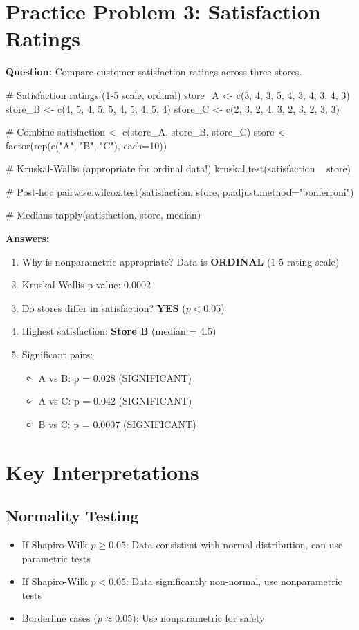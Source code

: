 \documentclass[11pt]{article}
\begin{document}
\section{Practice Problem 3: Satisfaction Ratings}

\textbf{Question:} Compare customer satisfaction ratings across three stores.

\begin{rcode}
# Satisfaction ratings (1-5 scale, ordinal)
store_A <- c(3, 4, 3, 5, 4, 3, 4, 3, 4, 3)
store_B <- c(4, 5, 4, 5, 5, 4, 5, 4, 5, 4)
store_C <- c(2, 3, 2, 4, 3, 2, 3, 2, 3, 3)

# Combine
satisfaction <- c(store_A, store_B, store_C)
store <- factor(rep(c("A", "B", "C"), each=10))

# Kruskal-Wallis (appropriate for ordinal data!)
kruskal.test(satisfaction ~ store)

# Post-hoc
pairwise.wilcox.test(satisfaction, store, p.adjust.method="bonferroni")

# Medians
tapply(satisfaction, store, median)
\end{rcode}

\textbf{Answers:}
\begin{enumerate}
\item \textcolor{answergreen}{Why is nonparametric appropriate? Data is \textbf{ORDINAL} (1-5 rating scale)}
\item \textcolor{answergreen}{Kruskal-Wallis p-value: 0.0002}
\item \textcolor{answergreen}{Do stores differ in satisfaction? \textbf{YES} ($p < 0.05$)}
\item \textcolor{answergreen}{Highest satisfaction: \textbf{Store B} (median = 4.5)}
\item \textcolor{answergreen}{Significant pairs:}
\begin{itemize}
\item \textcolor{answergreen}{A vs B: p = 0.028 (SIGNIFICANT)}
\item \textcolor{answergreen}{A vs C: p = 0.042 (SIGNIFICANT)}
\item \textcolor{answergreen}{B vs C: p = 0.0007 (SIGNIFICANT)}
\end{itemize}
\end{enumerate}

\section{Key Interpretations}

\subsection{Normality Testing}
\begin{itemize}
\item If Shapiro-Wilk $p \geq 0.05$: Data consistent with normal distribution, can use parametric tests
\item If Shapiro-Wilk $p < 0.05$: Data significantly non-normal, use nonparametric tests
\item Borderline cases ($p \approx 0.05$): Use nonparametric for safety
\end{itemize}
\end{document}
